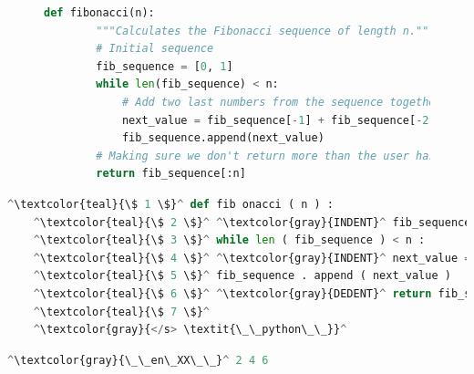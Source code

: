             \medskip
            \begin{figure}[H]
                \begin{lstlisting}[language=Python, caption={Sample Python code for showcasing dataset formatting. The function calculates $n$ elements of the Fibonacci sequence.}, label={lst:comment}]
    def fibonacci(n):
        """Calculates the Fibonacci sequence of length n."""
        # Initial sequence
        fib_sequence = [0, 1]
        while len(fib_sequence) < n:
            # Add two last numbers from the sequence together
            next_value = fib_sequence[-1] + fib_sequence[-2]
            fib_sequence.append(next_value)
        # Making sure we don't return more than the user has requested
        return fib_sequence[:n]
                \end{lstlisting}
            \end{figure}
            \begin{minipage}{.45\textwidth}
                \begin{lstlisting}[language=Python, caption={Code in listing \ref{lst:comment} formatted as an input for comment detection, italics denote global attention. \\ Note that the code has been ran through the PLBART's preprocessor function, which introduced \texttt{INDENT} and \texttt{DEDENT} tokens, as well as added spacing between tokens.}, label={lst:comment_source}]
    ^\textcolor{teal}{\$ 1 \$}^ def fib onacci ( n ) :
    ^\textcolor{teal}{\$ 2 \$}^ ^\textcolor{gray}{INDENT}^ fib_sequence = [ 0 , 1 ]
    ^\textcolor{teal}{\$ 3 \$}^ while len ( fib_sequence ) < n :
    ^\textcolor{teal}{\$ 4 \$}^ ^\textcolor{gray}{INDENT}^ next_value = fib_sequence [ - 1 ] + fib_sequence [ - 2 ]
    ^\textcolor{teal}{\$ 5 \$}^ fib_sequence . append ( next_value )
    ^\textcolor{teal}{\$ 6 \$}^ ^\textcolor{gray}{DEDENT}^ return fib_sequence [ : n ]
    ^\textcolor{teal}{\$ 7 \$}^
    ^\textcolor{gray}{</s> \textit{\_\_python\_\_}}^
                \end{lstlisting}
            \end{minipage}
            \hfill
            \begin{minipage}{.45\textwidth}
                \begin{lstlisting}[language=Python, caption={Code in listing \ref{lst:comment} formatted as a label.}]
    ^\textcolor{gray}{\_\_en\_XX\_\_}^ 2 4 6
                \end{lstlisting}
            \end{minipage}
            
